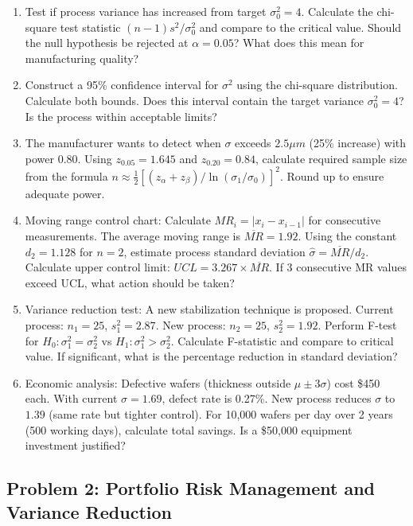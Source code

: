 \documentclass[12pt]{article}
\begin{document}
\begin{enumerate}[label=(\alph*)]
\item Test if process variance has increased from target $\sigma_0^2 = 4$. Calculate the chi-square test statistic $(n-1)s^2/\sigma_0^2$ and compare to the critical value. Should the null hypothesis be rejected at $\alpha = 0.05$? What does this mean for manufacturing quality?

\item Construct a 95\% confidence interval for $\sigma^2$ using the chi-square distribution. Calculate both bounds. Does this interval contain the target variance $\sigma_0^2 = 4$? Is the process within acceptable limits?

\item The manufacturer wants to detect when $\sigma$ exceeds $2.5\mu m$ (25\% increase) with power 0.80. Using $z_{0.05} = 1.645$ and $z_{0.20} = 0.84$, calculate required sample size from the formula $n \approx \frac{1}{2}[(z_\alpha + z_\beta)/\ln(\sigma_1/\sigma_0)]^2$. Round up to ensure adequate power.

\item Moving range control chart: Calculate $MR_i = |x_i - x_{i-1}|$ for consecutive measurements. The average moving range is $\overline{MR} = 1.92$. Using the constant $d_2 = 1.128$ for $n=2$, estimate process standard deviation $\hat{\sigma} = \overline{MR}/d_2$. Calculate upper control limit: $UCL = 3.267 \times \overline{MR}$. If 3 consecutive MR values exceed UCL, what action should be taken?

\item Variance reduction test: A new stabilization technique is proposed. Current process: $n_1 = 25$, $s_1^2 = 2.87$. New process: $n_2 = 25$, $s_2^2 = 1.92$. Perform F-test for $H_0: \sigma_1^2 = \sigma_2^2$ vs $H_1: \sigma_1^2 > \sigma_2^2$. Calculate F-statistic and compare to critical value. If significant, what is the percentage reduction in standard deviation?

\item Economic analysis: Defective wafers (thickness outside $\mu \pm 3\sigma$) cost \$450 each. With current $\sigma = 1.69$, defect rate is 0.27\%. New process reduces $\sigma$ to $1.39$ (same rate but tighter control). For 10,000 wafers per day over 2 years (500 working days), calculate total savings. Is a \$50,000 equipment investment justified?
\end{enumerate}

\subsection*{Problem 2: Portfolio Risk Management and Variance Reduction}
\end{document}
